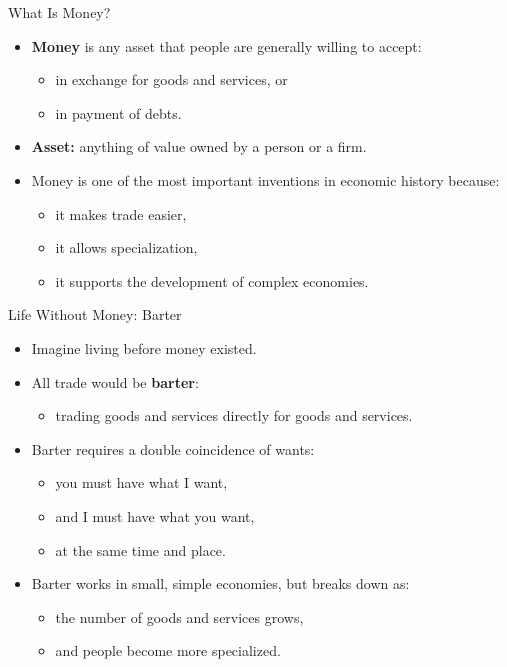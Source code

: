 \documentclass[aspectratio=169]{beamer}
\begin{document}
\begin{frame}{What Is Money?}
\transfade
\begin{itemize}[<+->]
  \item \textbf{Money} is \alert{any asset} that people are generally willing to accept:
  \begin{itemize}[<+->]
    \item in exchange for goods and services, or
    \item in payment of debts.
  \end{itemize}
  \item \textbf{Asset:} anything of value owned by a person or a firm.
  \item Money is one of the most important inventions in economic history because:
  \begin{itemize}[<+->]
    \item it makes trade easier,
    \item it allows specialization,
    \item it supports the development of complex economies.
  \end{itemize}
\end{itemize}
\end{frame}

\begin{frame}{Life Without Money: Barter}
\transfade
\begin{itemize}[<+->]
  \item Imagine living before money existed.
  \item All trade would be \textbf{barter}:
  \begin{itemize}[<+->]
    \item trading goods and services directly for goods and services.
  \end{itemize}
  \item Barter requires a \alert{double coincidence of wants}:
  \begin{itemize}[<+->]
    \item you must have what I want,
    \item and I must have what you want,
    \item at the same time and place.
  \end{itemize}
  \item Barter works in small, simple economies, but breaks down as:
  \begin{itemize}[<+->]
    \item the number of goods and services grows,
    \item and people become more specialized.
  \end{itemize}
\end{itemize}
\end{frame}
\end{document}

